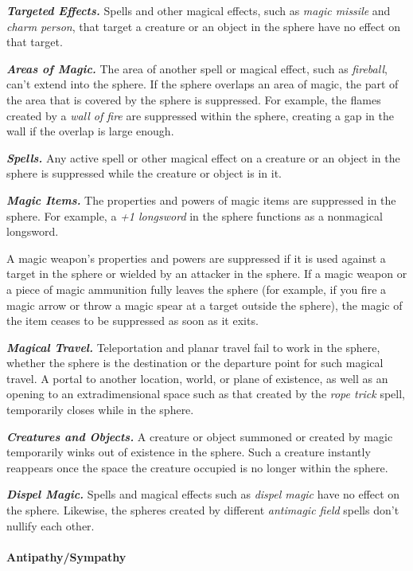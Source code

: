 \documentclass[
]{article}
\begin{document}
\emph{\textbf{Targeted Effects.}} Spells and other magical effects, such
as \emph{magic missile} and \emph{charm person}, that target a creature
or an object in the sphere have no effect on that target.

\emph{\textbf{Areas of Magic.}} The area of another spell or magical
effect, such as \emph{fireball}, can't extend into the sphere. If the
sphere overlaps an area of magic, the part of the area that is covered
by the sphere is suppressed. For example, the flames created by a
\emph{wall of fire} are suppressed within the sphere, creating a gap in
the wall if the overlap is large enough.

\emph{\textbf{Spells.}} Any active spell or other magical effect on a
creature or an object in the sphere is suppressed while the creature or
object is in it.

\emph{\textbf{Magic Items.}} The properties and powers of magic items
are suppressed in the sphere. For example, a \emph{+1 longsword} in the
sphere functions as a nonmagical longsword.

A magic weapon's properties and powers are suppressed if it is used
against a target in the sphere or wielded by an attacker in the sphere.
If a magic weapon or a piece of magic ammunition fully leaves the sphere
(for example, if you fire a magic arrow or throw a magic spear at a
target outside the sphere), the magic of the item ceases to be
suppressed as soon as it exits.

\emph{\textbf{Magical Travel.}} Teleportation and planar travel fail to
work in the sphere, whether the sphere is the destination or the
departure point for such magical travel. A portal to another location,
world, or plane of existence, as well as an opening to an
extradimensional space such as that created by the \emph{rope trick}
spell, temporarily closes while in the sphere.

\emph{\textbf{Creatures and Objects.}} A creature or object summoned or
created by magic temporarily winks out of existence in the sphere. Such
a creature instantly reappears once the space the creature occupied is
no longer within the sphere.

\emph{\textbf{Dispel Magic.}} Spells and magical effects such as
\emph{dispel magic} have no effect on the sphere. Likewise, the spheres
created by different \emph{antimagic field} spells don't nullify each
other.

\hypertarget{antipathysympathy}{%
\paragraph{Antipathy/Sympathy}\label{antipathysympathy}}
\end{document}
